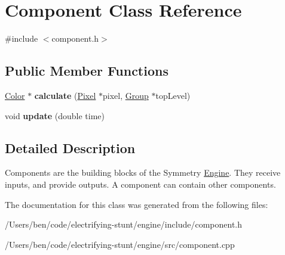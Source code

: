 \hypertarget{class_component}{}\section{Component Class Reference}
\label{class_component}


{\ttfamily \#include $<$component.\+h$>$}

\subsection*{Public Member Functions}
\begin{DoxyCompactItemize}
\item 
\hypertarget{class_component_a0157a7420c09de92e69c16b0ef19ff75}{}\hyperlink{class_color}{Color} $\ast$ {\bfseries calculate} (\hyperlink{class_pixel}{Pixel} $\ast$pixel, \hyperlink{class_group}{Group} $\ast$top\+Level)\label{class_component_a0157a7420c09de92e69c16b0ef19ff75}

\item 
\hypertarget{class_component_ac725cda36ffae15b1b2caad9b163feee}{}void {\bfseries update} (double time)\label{class_component_ac725cda36ffae15b1b2caad9b163feee}

\end{DoxyCompactItemize}


\subsection{Detailed Description}
Components are the building blocks of the Symmetry \hyperlink{class_engine}{Engine}. They receive inputs, and provide outputs. A component can contain other components. 

The documentation for this class was generated from the following files\+:\begin{DoxyCompactItemize}
\item 
/\+Users/ben/code/electrifying-\/stunt/engine/include/component.\+h\item 
/\+Users/ben/code/electrifying-\/stunt/engine/src/component.\+cpp\end{DoxyCompactItemize}
